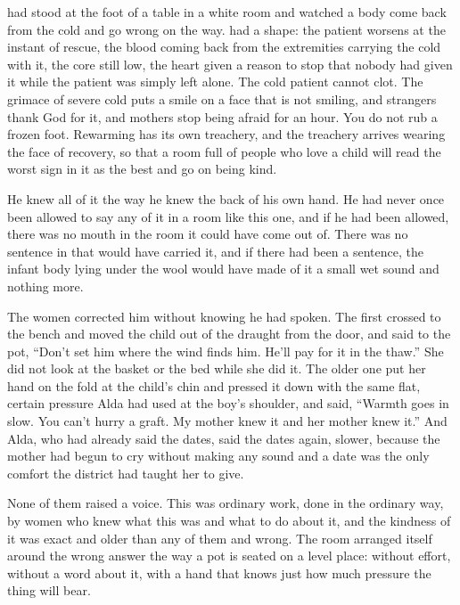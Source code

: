 had stood at the foot of a table in a white room and watched a body come back from the cold and go wrong on the way.  had a shape: the patient worsens at the instant of rescue, the blood coming back from the extremities carrying the cold with it, the core still low, the heart given a reason to stop that nobody had given it while the patient was simply left alone. The cold patient cannot clot. The grimace of severe cold puts a smile on a face that is not smiling, and strangers thank God for it, and mothers stop being afraid for an hour. You do not rub a frozen foot. Rewarming has its own treachery, and the treachery arrives wearing the face of recovery, so that a room full of people who love a child will read the worst sign in it as the best and go on being kind.

He knew all of it the way he knew the back of his own hand. He had never once been allowed to say any of it in a room like this one, and if he had been allowed, there was no mouth in the room it could have come out of. There was no sentence in  that would have carried it, and if there had been a sentence, the infant body lying under the wool would have made of it a small wet sound and nothing more.

The women corrected him without knowing he had spoken. The first crossed to the bench and moved the child out of the draught from the door, and said to the pot, “Don't set him where the wind finds him. He'll pay for it in the thaw.” She did not look at the basket or the bed while she did it. The older one put her hand on the fold at the child's chin and pressed it down with the same flat, certain pressure Alda had used at the boy's shoulder, and said, “Warmth goes in slow. You can't hurry a graft. My mother knew it and her mother knew it.” And Alda, who had already said the dates, said the dates again, slower, because the mother had begun to cry without making any sound and a date was the only comfort the district had taught her to give.

None of them raised a voice. This was ordinary work, done in the ordinary way, by women who knew what this was and what to do about it, and the kindness of it was exact and older than any of them and wrong. The room arranged itself around the wrong answer the way a pot is seated on a level place: without effort, without a word about it, with a hand that knows just how much pressure the thing will bear.

